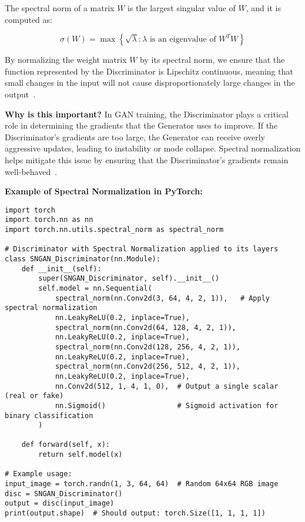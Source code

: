 The spectral norm of a matrix \( W \) is the largest singular value of \( W \), and it is computed as:

\[
\sigma(W) = \max \left\{ \sqrt{\lambda} : \lambda \text{ is an eigenvalue of } W^T W \right\}
\]

By normalizing the weight matrix \( W \) by its spectral norm, we ensure that the function represented by the Discriminator is Lipschitz continuous, meaning that small changes in the input will not cause disproportionately large changes in the output~\cite{bjorck2021towards}.

\textbf{Why is this important?}  
In GAN training, the Discriminator plays a critical role in determining the gradients that the Generator uses to improve. If the Discriminator's gradients are too large, the Generator can receive overly aggressive updates, leading to instability or mode collapse. Spectral normalization helps mitigate this issue by ensuring that the Discriminator's gradients remain well-behaved~\cite{miyato2018spectral}.

\textbf{Example of Spectral Normalization in PyTorch:}

\begin{lstlisting}[style=python]
import torch
import torch.nn as nn
import torch.nn.utils.spectral_norm as spectral_norm

# Discriminator with Spectral Normalization applied to its layers
class SNGAN_Discriminator(nn.Module):
    def __init__(self):
        super(SNGAN_Discriminator, self).__init__()
        self.model = nn.Sequential(
            spectral_norm(nn.Conv2d(3, 64, 4, 2, 1)),   # Apply spectral normalization
            nn.LeakyReLU(0.2, inplace=True),
            spectral_norm(nn.Conv2d(64, 128, 4, 2, 1)),
            nn.LeakyReLU(0.2, inplace=True),
            spectral_norm(nn.Conv2d(128, 256, 4, 2, 1)),
            nn.LeakyReLU(0.2, inplace=True),
            spectral_norm(nn.Conv2d(256, 512, 4, 2, 1)),
            nn.LeakyReLU(0.2, inplace=True),
            nn.Conv2d(512, 1, 4, 1, 0),  # Output a single scalar (real or fake)
            nn.Sigmoid()                 # Sigmoid activation for binary classification
        )

    def forward(self, x):
        return self.model(x)

# Example usage:
input_image = torch.randn(1, 3, 64, 64)  # Random 64x64 RGB image
disc = SNGAN_Discriminator()
output = disc(input_image)
print(output.shape)  # Should output: torch.Size([1, 1, 1, 1])
\end{lstlisting}


